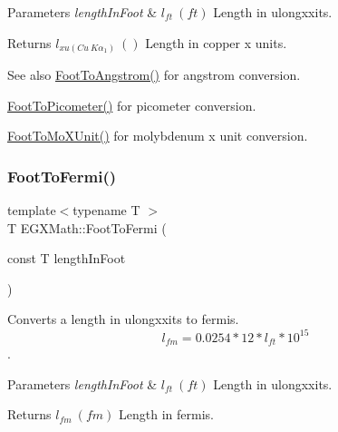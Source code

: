 \begin{DoxyParams}{Parameters}
{\em length\+In\+Foot} & $ l_{ft}\ (ft)$ Length in ulongxxits. \\
\hline
\end{DoxyParams}
\begin{DoxyReturn}{Returns}
$ l_{xu(Cu\ K\alpha_1)}\ ()$ Length in copper x units. 
\end{DoxyReturn}
\begin{DoxySeeAlso}{See also}
\mbox{\hyperlink{group___e_g_x_math-_conversions-_length_conversions-_imperial-_foot-_non-_s_i_ga39b1712b38ad7c61cb859376f07decda}{Foot\+To\+Angstrom()}} for angstrom conversion. 

\mbox{\hyperlink{group___e_g_x_math-_conversions-_length_conversions-_imperial-_foot-_s_i_ga2d46da89e13218f0c8d75356c0d03942}{Foot\+To\+Picometer()}} for picometer conversion. 

\mbox{\hyperlink{group___e_g_x_math-_conversions-_length_conversions-_imperial-_foot-_non-_s_i_ga06bc5f701660697593ed1aacd4abd3d6}{Foot\+To\+Mo\+X\+Unit()}} for molybdenum x unit conversion. 
\end{DoxySeeAlso}
\mbox{\label{group___e_g_x_math-_conversions-_length_conversions-_imperial-_foot-_non-_s_i_gac61392c75e58e12f6a8a99aa765f22a0}} 
\subsubsection{\texorpdfstring{Foot\+To\+Fermi()}{FootToFermi()}}
{\footnotesize\ttfamily template$<$typename T $>$ \\
T E\+G\+X\+Math\+::\+Foot\+To\+Fermi (\begin{DoxyParamCaption}\item[{const T}]{length\+In\+Foot }\end{DoxyParamCaption})}



Converts a length in ulongxxits to fermis. \[ l_{fm}=0.0254 * 12 * l_{ft} * 10^{15} \]. 


\begin{DoxyParams}{Parameters}
{\em length\+In\+Foot} & $ l_{ft}\ (ft)$ Length in ulongxxits. \\
\hline
\end{DoxyParams}
\begin{DoxyReturn}{Returns}
$ l_{fm}\ (fm)$ Length in fermis. 
\end{DoxyReturn}
\mbox{\label{group___e_g_x_math-_conversions-_length_conversions-_imperial-_foot-_non-_s_i_ga0360d043c5150d90e61ad28c1fb81cc1}} 

